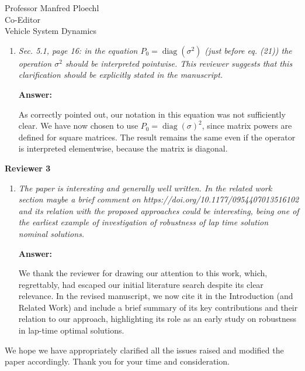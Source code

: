 \documentclass{letter}
\DeclareMathOperator{\diag}{diag}
\begin{document}
\begin{letter}{Professor Manfred Ploechl\\
Co-Editor\\
Vehicle System Dynamics}
\begin{enumerate}
\hrulefill

\item
\textit{Sec. 5.1, page 16: in the equation $P_0=\diag(\sigma^2)$ (just before eq. (21)) the operation $\sigma^2$ should be interpreted pointwise. This reviewer suggests that this clarification should be explicitly stated in the manuscript.}

\vspace{2mm}

\textbf{Answer:}

As correctly pointed out, our notation in this equation was not sufficiently clear. We have now chosen to use $P_0=\diag(\sigma)^2$, since matrix powers are defined for square matrices. The result remains the same even if the operator is interpreted elementwise, because the matrix is diagonal.

\hrulefill

\end{enumerate}

\textbf{Reviewer 3}

\begin{enumerate}

\item
\textit{The paper is interesting and generally well written. In the related work section maybe a brief comment on https://doi.org/10.1177/0954407013516102 and its relation with the proposed approaches could be interesting, being one of the earliest example of investigation of robustness of lap time solution nominal solutions.}

\vspace{2mm}

\textbf{Answer:}

We thank the reviewer for drawing our attention to this work, which, regrettably, had escaped our initial literature search despite its clear relevance. In the revised manuscript, we now cite it in the Introduction (and Related Work) and include a brief summary of its key contributions and their relation to our approach, highlighting its role as an early study on robustness in lap-time optimal solutions.

\hrulefill

\end{enumerate}

We hope we have appropriately clarified all the issues raised and modified the paper accordingly. Thank you for your time and consideration.



\end{letter}
\end{document}
